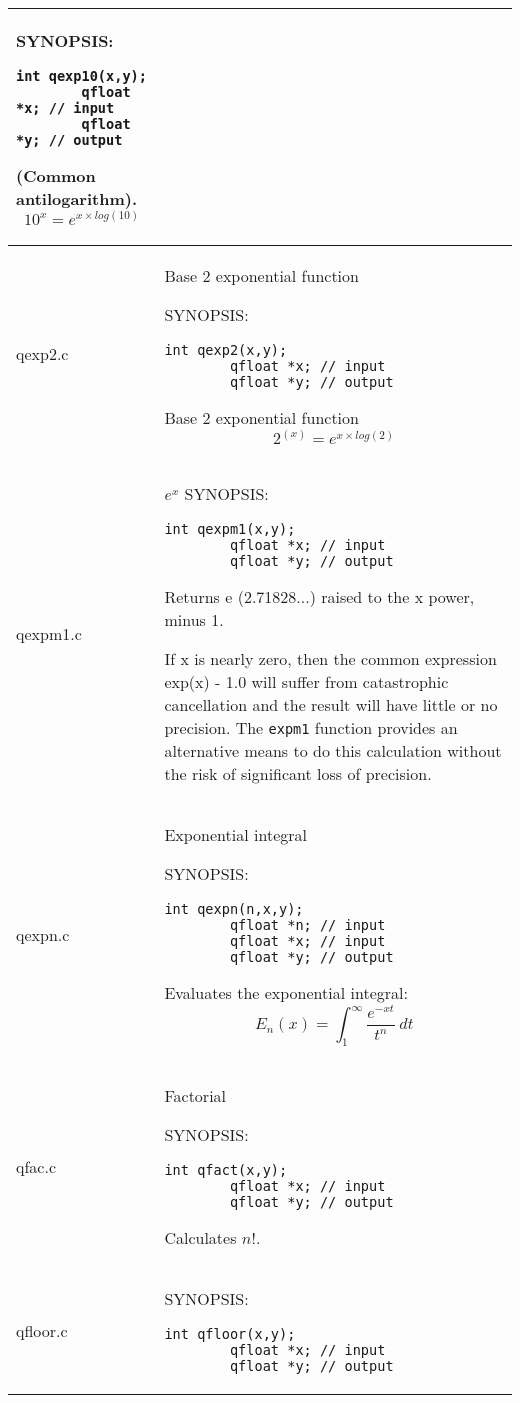 \documentclass[10pt,a4paper,x11names]{memoir} %
\begin{document}
\begin{longtable}{|p{1.5cm}|p{11.5cm}|}
	{\footnotesize SYNOPSIS:}\vspace{-0.2cm}\index{qexp10}
	\begin{lstlisting}[numbers=none]
		int qexp10(x,y);
		qfloat *x; // input
		qfloat *y; // output
	\end{lstlisting}\vspace{-0.2cm}
	(Common antilogarithm).
	$$10^x=e^{x \times log(10)}$$
	\\\hline
	qexp2.c& Base 2 exponential function
	
	{\footnotesize SYNOPSIS:}\vspace{-0.2cm}\index{qexp2}
	\begin{lstlisting}[numbers=none]
		int qexp2(x,y);
		qfloat *x; // input
		qfloat *y; // output
	\end{lstlisting}\vspace{-0.2cm}
	Base 2 exponential function
	$$2^(x)=e^{x\times log(2)}$$
	\\\hline
	qexpm1.c& $e^x$\index{qexpm1}
	{\footnotesize SYNOPSIS:}\vspace{-0.2cm}
	\begin{lstlisting}[numbers=none]
		int qexpm1(x,y);
		qfloat *x; // input
		qfloat *y; // output
	\end{lstlisting}\vspace{-0.2cm}
	Returns e (2.71828...) raised to the x power, minus 1.
	
	 If x is nearly zero, then the common expression exp(x) - 1.0 will suffer from catastrophic
	cancellation and the result will have little or no precision.  The \verb,expm1, function provides
	an alternative means to do this calculation without the risk of significant loss of precision.
	\\\hline
	qexpn.c& Exponential integral
	
	{\footnotesize SYNOPSIS:}\vspace{-0.2cm}
	\begin{lstlisting}[numbers=none]
		int qexpn(n,x,y);
		qfloat *n; // input
		qfloat *x; // input
		qfloat *y; // output
	\end{lstlisting}\vspace{-0.2cm}\index{qexpn}
	Evaluates the exponential integral:
	$$E_n(x)=\int_{1}^{\infty}\frac{e^{-xt}}{t^n}\ dt$$
	\\\hline
	qfac.c& Factorial
	
	{\footnotesize SYNOPSIS:}\vspace{-0.2cm}
	\begin{lstlisting}[numbers=none]
		int qfact(x,y);
		qfloat *x; // input
		qfloat *y; // output
	\end{lstlisting}\vspace{-0.2cm}
	Calculates $n!$.
	\\\hline
	qfloor.c&
	{\footnotesize SYNOPSIS:}\vspace{-0.2cm}
	\begin{lstlisting}[numbers=none]
		int qfloor(x,y);
		qfloat *x; // input
		qfloat *y; // output
	\end{lstlisting}\vspace{-0.2cm}
	

\end{longtable}
\end{document}
